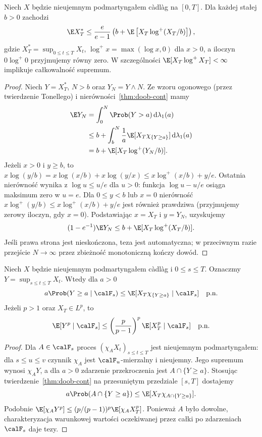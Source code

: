 \begin{twierdzenie}
\label{thm:doob-llogl-cont}
Niech $X$ będzie nieujemnym podmartyngałem c\`adl\`ag
na $[0,T]$. Dla każdej stałej $b>0$ zachodzi
\[
\E X_T^*\le\frac{e}{e-1}
\left(b+\E\left[X_T\log^+(X_T/b)\right]\right),
\]
gdzie $X_T^*=\sup_{0\le t\le T}X_t$,
$\log^+ x=\max(\log x,0)$ dla $x>0$,
a iloczyn $0\log^+0$ przyjmujemy równy zero.
W szczególności $\E[X_T\log^+X_T]<\infty$
implikuje całkowalność supremum.
\end{twierdzenie}
\begin{proof}
Niech $Y=X_T^*$, $N>b$ oraz $Y_N=Y\wedge N$.
Ze wzoru ogonowego (przez twierdzenie Tonellego)
i nierówności~\ref{thm:doob-cont} mamy
\[
\begin{aligned}
\E Y_N
&=\int_0^N\Prob(Y>a)\,\mathrm d\lambda_1(a)\\
&\le b+\int_b^N\frac1a
\E[X_T\chi_{\{Y\ge a\}}]\,\mathrm d\lambda_1(a)\\
&=b+\E[X_T\log^+(Y_N/b)].
\end{aligned}
\]
Jeżeli $x>0$ i $y\ge b$, to
$x\log(y/b)=x\log(x/b)+x\log(y/x)
\le x\log^+(x/b)+y/e$.
Ostatnia nierówność wynika z
$\log u\le u/e$ dla $u>0$:
funkcja $\log u-u/e$ osiąga maksimum zero
w $u=e$. Dla $0\le y<b$ lub $x=0$
nierówność $x\log^+(y/b)\le x\log^+(x/b)+y/e$
jest również prawdziwa (przyjmujemy zerowy
iloczyn, gdy $x=0$).
Podstawiając $x=X_T$ i $y=Y_N$, uzyskujemy
\[
(1-e^{-1})\E Y_N\le
b+\E[X_T\log^+(X_T/b)].
\]
Jeśli prawa strona jest nieskończona,
teza jest automatyczna; w przeciwnym razie
przejście $N\to\infty$ przez zbieżność
monotoniczną kończy dowód.
\end{proof}

\begin{twierdzenie}
\label{thm:doob-conditional-cont}
Niech $X$ będzie nieujemnym podmartyngałem
c\`adl\`ag i $0\le s\le T$.
Oznaczmy $Y=\sup_{s\le t\le T}X_t$.
Wtedy dla $a>0$
\[
a\Prob(Y\ge a\mid\calF_s)
\le\E[X_T\chi_{\{Y\ge a\}}\mid\calF_s]
\quad\text{p.n.}
\]
Jeżeli $p>1$ oraz $X_T\in L^p$, to
\[
\E[Y^p\mid\calF_s]\le
\left(\frac p{p-1}\right)^p
\E[X_T^p\mid\calF_s]\quad\text{p.n.}
\]
\end{twierdzenie}
\begin{proof}
Dla $A\in\calF_s$ proces
$(\chi_A X_t)_{s\le t\le T}$ jest nieujemnym
podmartyngałem: dla $s\le u\le v$
czynnik $\chi_A$ jest $\calF_u$-mierzalny
i nieujemny. Jego supremum wynosi $\chi_A Y$,
a dla $a>0$ zdarzenie przekroczenia jest
$A\cap\{Y\ge a\}$.
Stosując twierdzenie~\ref{thm:doob-cont}
na przesuniętym przedziale $[s,T]$ dostajemy
\[
a\Prob(A\cap\{Y\ge a\})\le
\E[X_T\chi_{A\cap\{Y\ge a\}}].
\]
Podobnie $\E[\chi_A Y^p]\le
(p/(p-1))^p\E[\chi_A X_T^p]$.
Ponieważ $A$ było dowolne, charakteryzacja
warunkowej wartości oczekiwanej przez
całki po zdarzeniach $\calF_s$ daje tezy.
\end{proof}

